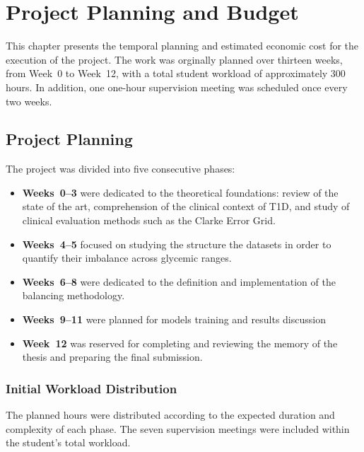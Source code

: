 
\chapter{Project Planning and Budget}
\label{chap:planning_budget}

This chapter presents the temporal planning and estimated economic cost for the execution of the project. The work was orginally planned over thirteen weeks, from Week~0 to Week~12, with a total student workload of approximately 300 hours. In addition, one one-hour supervision meeting was scheduled once every two weeks.

\section{Project Planning}
\label{sec:project_planning}

The project was divided into five consecutive phases:

\begin{itemize}
    \item \textbf{Weeks~0--3} were dedicated to the theoretical foundations: review of the state of the art, comprehension of the clinical context of T1D, and study of clinical evaluation methods such as the Clarke Error Grid.
    \item \textbf{Weeks~4--5} focused on studying the structure the datasets in order to quantify their imbalance across glycemic ranges.
    \item \textbf{Weeks~6--8} were dedicated to the definition and implementation of the balancing methodology.
    \item \textbf{Weeks~9--11} were planned for models training and results discussion
    \item \textbf{Week~12} was reserved for completing and reviewing the memory of the thesis and preparing the final submission.
\end{itemize} 

\subsection{Initial Workload Distribution}
\label{subsec:initial_workload}

The planned hours were distributed according to the expected duration and complexity of each phase. The seven supervision meetings were included within the student's total workload.

